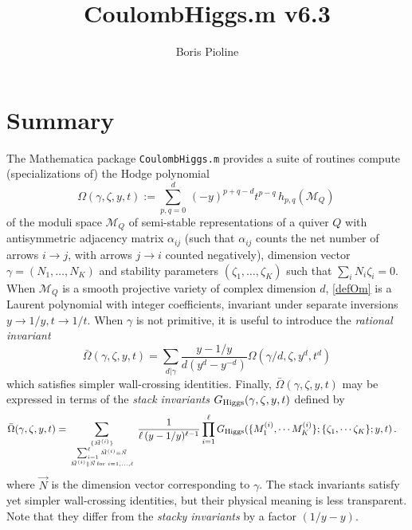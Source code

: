 \documentclass[12pt]{JHEP3}
\title{CoulombHiggs.m v6.3}
\author{Boris Pioline}
\newcommand{\be}{\begin{equation}}
\newcommand{\ee}{\end{equation}}
\newcommand\bOm{\bar\Omega}
\newcommand{\cM}{\mathcal{M}}
\newcommand{\gR}{G_{\rm Higgs}}
\begin{document}
\maketitle

\baselineskip 15pt

\tableofcontents

\medskip

\section{Summary}

The  {\sc Mathematica} package {\tt CoulombHiggs.m} provides a suite of routines compute (specializations of) the Hodge polynomial 
\be
\label{defOm}
\Omega(\gamma,\zeta,y,t) := 
\sum_{p,q=0}^{d}\, (-y)^{p+q-d} t^{p-q}\, h_{p,q}(\cM_Q)\, 
\ee
of the moduli space $\cM_Q$ of semi-stable representations of a quiver $Q$ with antisymmetric
adjacency matrix $\alpha_{ij}$ (such that $\alpha_{ij}$ counts the net number of arrows $i\to j$, with
arrows $j\to i$ counted negatively),  dimension vector $\gamma=(N_1,\dots, N_K)$ and stability parameters $(\zeta_1,\dots, \zeta_K)$ such that $\sum_i N_i \zeta_i=0$. When $\cM_Q$ is 
a smooth projective variety of complex dimension $d$, \eqref{defOm} is a Laurent polynomial  with integer coefficients, invariant under separate inversions $y\to 1/y, t\to 1/t$. When $\gamma$ is not primitive, it is useful to introduce the {\it rational invariant}
\be
\label{defbOm}
\bOm(\gamma,\zeta,y,t)=\sum_{d|\gamma} \frac{y-1/y}{d(y^d-y^{-d})} \Omega(\gamma/d,\zeta,y^d,t^d)\ee 
which satisfies simpler wall-crossing identities. Finally, $\bOm(\gamma,\zeta,y,t)$ may be expressed 
in terms of the {\it stack invariants} $G_{\rm Higgs}(\gamma,\zeta,y,t)$ defined by \cite[(4.1)]{Manschot:2013sya}
\be
\label{eq:inversestackinv}
\begin{split}
\bOm(\gamma,\zeta,y,t) 
  =& %
  \sum_{\{\vec M^{(i)}\} \atop {
  \sum_{i=1}^\ell \vec M^{(i)}=\vec N \atop  \vec M^{(i)}\parallel \vec N
  \,\mathrm{for}\,\, i=1,\dots,\ell}}
\frac{1}{\ell\,(y-1/y)^{\ell-1}}  
\prod_{i=1}^\ell 
\gR(\{ M^{(i)}_1, \cdots M^{(i)}_K \};
\{\zeta_1, \cdots \zeta_K\};y,t)
\, .  
\end{split}
\ee
where $\vec N$ is the dimension vector corresponding to $\gamma$. The stack invariants 
satisfy yet simpler wall-crossing identities, but their physical meaning is less transparent.
Note that they differ from the {\it stacky invariants} by a factor $(1/y-y)$.
\end{document}
